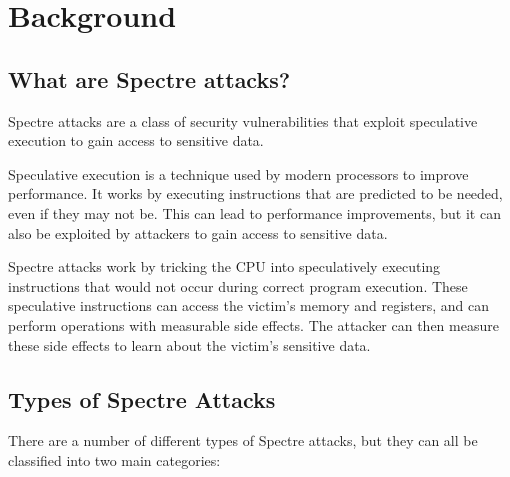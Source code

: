 \documentclass[twocolumn,showpacs,%
  nofootinbib,aps,superscriptaddress,%
  eqsecnum,prd,notitlepage,showkeys,10pt]{revtex4-1}
\begin{document}
\section{Background}
\label{sec:examples}

\subsection{What are Spectre attacks?}

Spectre attacks are a class of security vulnerabilities that exploit speculative execution to gain access to sensitive data.

Speculative execution is a technique used by modern processors to improve performance. It works by executing instructions that are predicted to be needed, even if they may not be. This can lead to performance improvements, but it can also be exploited by attackers to gain access to sensitive data.

Spectre attacks work by tricking the CPU into speculatively executing instructions that would not occur during correct program execution. These speculative instructions can access the victim's memory and registers, and can perform operations with measurable side effects. The attacker can then measure these side effects to learn about the victim's sensitive data.

\subsection{Types of Spectre Attacks}

There are a number of different types of Spectre attacks, but they can all be classified into two main categories\cite{kocher2020spectre}:
\end{document}
